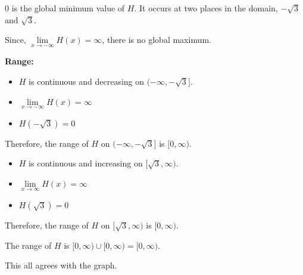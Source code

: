 \documentclass{ximera}
\begin{document}
$0$ is the global minimum value of $H$. It occurs at two places in the domain, $-\sqrt{3}$ and $\sqrt{3}$. 



Since, $\lim\limits_{x \to -\infty} H(x) = \infty$, there is no global maximum. 














\textbf{\textcolor{blue!55!black}{Range:}} 



\begin{itemize}
\item $H$ is continuous and decreasing on $( -\infty, -\sqrt{3} ]$. 
\item $\lim\limits_{x \to -\infty} H(x) = \infty$ 
\item $H(-\sqrt{3}) = 0$
\end{itemize}

Therefore, the range of $H$ on $( -\infty, -\sqrt{3} ]$ is $[0, \infty)$. 




\begin{itemize}
\item $H$ is continuous and increasing on $[ \sqrt{3} ,\infty)$. 
\item $\lim\limits_{x \to \infty} H(x) = \infty$ 
\item $H(\sqrt{3}) = 0$
\end{itemize}

Therefore, the range of $H$ on $[ \sqrt{3}, \infty )$ is $[0, \infty)$. 








The range of $H$ is $[0, \infty) \cup [0, \infty) = [0, \infty)$.




This all agrees with the graph. 
\end{document}
